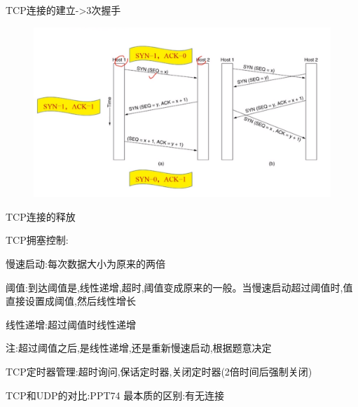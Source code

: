 \documentclass[UTF8,a4paper]{ctexart}
\begin{document}
TCP连接的建立->3次握手
\begin{figure}[H]
  \centering
  \includegraphics[scale = 0.3]{assets/jisuanjiwangluo_7265f.png}
\end{figure}


TCP连接的释放

TCP拥塞控制:

慢速启动:每次数据大小为原来的两倍

阈值:到达阈值是,线性递增,超时,阈值变成原来的一般。当慢速启动超过阈值时,值直接设置成阈值,然后线性增长

线性递增:超过阈值时线性递增

注:超过阈值之后,是线性递增,还是重新慢速启动,根据题意决定

TCP定时器管理:超时询问,保话定时器,关闭定时器(2倍时间后强制关闭)

TCP和UDP的对比:PPT74
最本质的区别:有无连接
\end{document}
